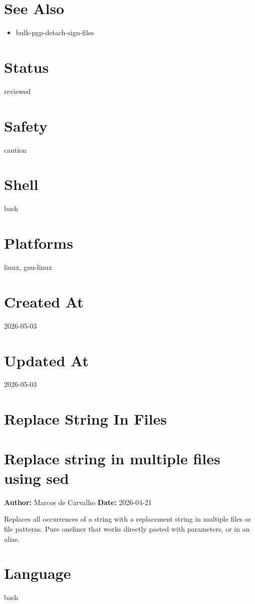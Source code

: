 \documentclass[openany]{book}
\begin{document}
\section*{See Also}
\begin{itemize}
  \item bulk-pgp-detach-sign-files
\end{itemize}

\section*{Status}
reviewed

\section*{Safety}
caution

\section*{Shell}
bash

\section*{Platforms}
linux, gnu-linux

\section*{Created At}
2026-05-03

\section*{Updated At}
2026-05-03

\section{Replace String In Files}
\section*{Replace string in multiple files using sed}
\textbf{Author:} Marcos de Carvalho \hfill \textbf{Date:} 2026-04-21

\noindent Replaces all occurrences of a string with a replacement string in multiple files or file patterns. Pure oneliner that works directly pasted with parameters, or in an alias.

\section*{Language}
bash
\end{document}
